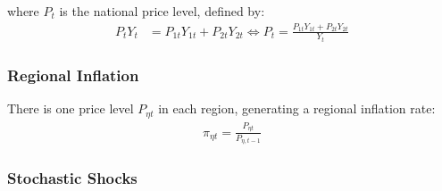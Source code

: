 \documentclass[../thesis.tex]{subfiles}
\begin{document}
where $P_t$ is the national price level, defined by:
\begin{align}
	P_{t} Y_{t} &= P_{1t} Y_{1t} + P_{2t} Y_{2t} \iff P_{t} = \frac{P_{1t} Y_{1t} + P_{2t} Y_{2t}}{Y_{t}} \label{eq_v5:national-price-level}
\end{align}

\begin{comment}
	\begin{align}
		P_{t} Y_{t} &= P_{1t} Y_{1t} + P_{2t} Y_{2t} \implies \nonumber \\
		P_{t} &= \frac{Y_{1t}}{Y_{t}} P_{1t} + \frac{Y_{2t}}{Y_{t}} P_{2t} \implies \nonumber \\
		P_{t} &= \theta_{P1} P_{1t} + (1 -\theta_{P1}) P_{2t} %
	\end{align}
	
	where $\theta_{P1}$ and $(1-\theta_{P1})$ are the price level weights of regions 1 and 2 in the national price level composition, respectively:
	\begin{align}
		\left\langle \begin{matrix} \theta_{P1} & (1-\theta_{P1}) \end{matrix} \right\rangle \coloneq \left\langle \begin{matrix} \frac{Y_{1t}}{Yt} & \frac{Y_{2t}}{Yt} \end{matrix} \right\rangle \label{eq_v5:reg-ss-P1-P2-weight-in-P}
	\end{align}
\end{comment}

\subsubsection*{Regional Inflation}

There is one price level $P_{\eta t}$ in each region, generating a regional inflation rate:
\begin{align}
	\pi_{\eta t} = \frac{P_{\eta t}}{P_{\eta, t-1}} \label{eq_v5:regional-inflation}
\end{align}


\subsubsection{Stochastic Shocks}\label{sec_v5:reg-stochastic-shocks}
\end{document}
